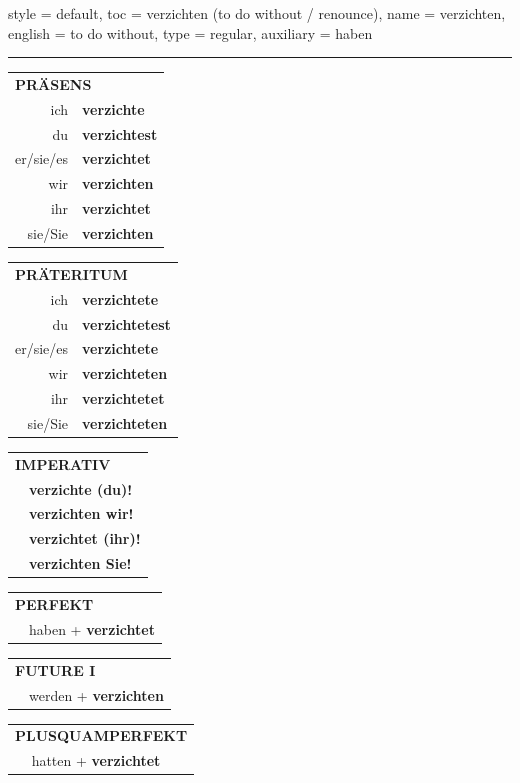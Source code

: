 \begin{verbentry}{
  style = {default},
  toc = {verzichten (to do without / renounce)},
  name = {verzichten},
  english = {to do without},
  type = {regular},
  auxiliary = {haben}
}


\vspace{5pt}
\hrule
\vspace{5pt}

\begin{tabular}{rl}
\multicolumn{2}{l}{\textbf{PRÄSENS}}\\
ich & \textbf{verzichte}\\
du & \textbf{verzichtest}\\
er/sie/es & \textbf{verzichtet}\\
wir & \textbf{verzichten}\\
ihr & \textbf{verzichtet}\\
sie/Sie & \textbf{verzichten}\\
\end{tabular}
\hfill
\begin{tabular}{rl}
\multicolumn{2}{l}{\textbf{PRÄTERITUM}}\\
ich & \textbf{verzichtete}\\
du & \textbf{verzichtetest}\\
er/sie/es & \textbf{verzichtete}\\
wir & \textbf{verzichteten}\\
ihr & \textbf{verzichtetet}\\
sie/Sie & \textbf{verzichteten}\\
\end{tabular}
\hfill
\begin{tabular}{rl}
\multicolumn{2}{l}{\textbf{IMPERATIV}}\\
& \textbf{verzichte (du)!}\\
& \textbf{verzichten wir!}\\
& \textbf{verzichtet (ihr)!}\\
& \textbf{verzichten Sie!}\\
\end{tabular}

\vspace{10pt}

\begin{tabular}{rl}
\multicolumn{2}{l}{\textbf{PERFEKT}}\\
& haben + \textbf{verzichtet}\\
\end{tabular}
\hfill
\begin{tabular}{rl}
\multicolumn{2}{l}{\textbf{FUTURE I}}\\
& werden + \textbf{verzichten}\\
\end{tabular}
\hfill
\begin{tabular}{rl}
\multicolumn{2}{l}{\textbf{PLUSQUAMPERFEKT}}\\
& hatten + \textbf{verzichtet}\\
\end{tabular}


\end{verbentry}
